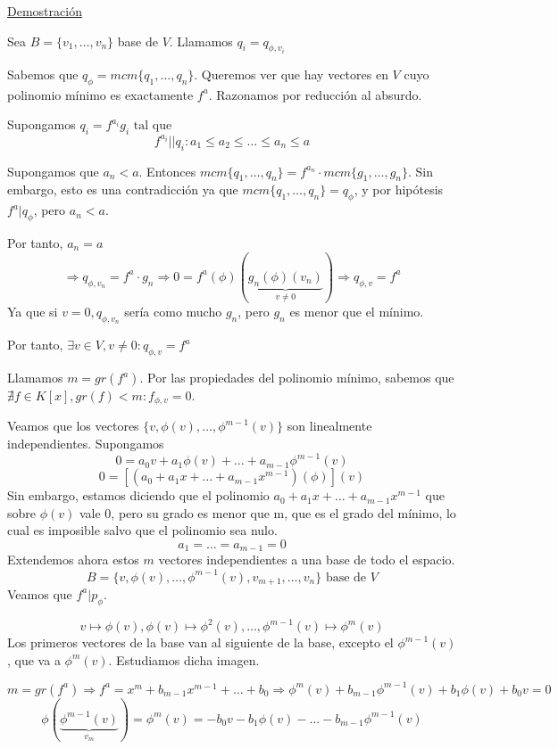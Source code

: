 \documentclass[10pt,a4paper,openright]{book}
\begin{document}
\underline{Demostración}

Sea $B = \{v_1, \ldots, v_n \}$ base de $V$. Llamamos $q_i = q_{\phi, v_i}$

Sabemos que $q_\phi = mcm \{q_1, \ldots, q_n\}$. Queremos ver que hay vectores en $V$ cuyo polinomio mínimo es exactamente $f^a$. Razonamos por reducción al absurdo.

Supongamos $q_i = f^{a_i} g_i \mbox{ tal que }$
$$f^{a_i} || q_i : a_1 \leq a_2 \leq \ldots \leq a_n \leq a$$

Supongamos que $a_n < a$. Entonces $ mcm \{q_1, \ldots, q_n\} = f^{a_n}  \cdot mcm \{g_1, \ldots, g_n\}$. Sin embargo, esto es una contradicción ya que $mcm \{q_1, \ldots, q_n\} = q_\phi$, y por hipótesis $f^a | q_\phi$, pero $a_n < a $.

Por tanto, $a_n = a$
$$\Rightarrow q_{\phi, v_n} = f^a \cdot g_n \Rightarrow 0 = f^a(\phi)(\underbrace{g_n(\phi)(v_n)}_{v \neq 0}) \Rightarrow q_{\phi, v} = f^a $$
Ya que si $v = 0, q_{\phi, v_n}$ sería como mucho $g_n$, pero $g_n$ es menor que el mínimo.

Por tanto, $\exists v \in V, v \neq 0 : q_{\phi, v} = f^a$

Llamamos $m = gr(f^a)$. Por las propiedades del polinomio mínimo, sabemos que $\nexists f \in K[x] , gr(f) < m : f_{\phi, v} = 0$.

Veamos que los vectores $\{v, \phi(v), \ldots, \phi^{m-1}(v)\}$ son linealmente independientes. Supongamos
$$ 0 = a_0 v + a_1 \phi(v) + \ldots + a_{m-1}\phi^{m-1}(v) $$
$$0 = \left[(a_0  + a_1 x + \ldots + a_{m-1}x^{m-1})(\phi)\right](v)$$
Sin embargo, estamos diciendo que el polinomio $a_0  + a_1 x + \ldots + a_{m-1}x^{m-1}$ que sobre $\phi(v)$ vale 0, pero su grado es menor que m, que es el grado del mínimo, lo cual es imposible salvo que el polinomio sea nulo.
$$a_1 = \ldots = a_{m-1} = 0$$
Extendemos ahora estos $m$ vectores independientes a una base de todo el espacio.
$$B = \{ v, \phi(v), \ldots, \phi^{m-1}(v), v_{m+1}, \ldots, v_n \} \mbox{ base de $V$}$$
Veamos que $f^a | p_\phi$.

$$v \mapsto \phi(v) , \phi(v) \mapsto \phi^2(v), \ldots, \phi^{m-1}(v) \mapsto \phi^m(v) $$
Los primeros vectores de la base van al siguiente de la base, excepto el $\phi^{m-1}(v)$, que va a $\phi^m(v)$. Estudiamos dicha imagen.

$$m= gr(f^a) \Rightarrow f^a = x^m + b_{m-1}x^{m-1} + \ldots + b_0  \Rightarrow \phi^m(v) + b_{m-1} \phi^{m-1} (v) + b_1 \phi(v) + b_0 v = 0$$
$$\phi(\underbrace{\phi^{m-1}(v)}_{v_m}) = \phi^m (v) = -b_0 v - b_1 \phi(v) - \ldots - b_{m-1} \phi^{m-1} (v) $$
\end{document}
